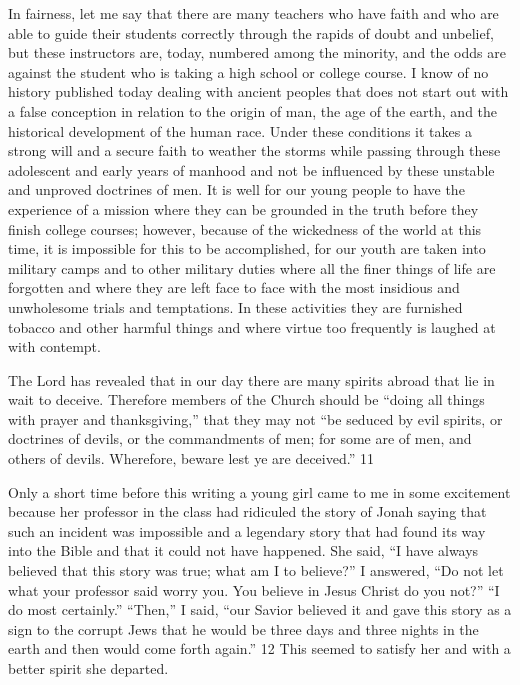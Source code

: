 In fairness, let me say that there are many teachers who have faith and who are able to guide
their students correctly through the rapids of doubt and unbelief, but these instructors are,
today, numbered among the minority, and the odds are against the student who is taking a
high school or college course. I know of no history published today dealing with ancient
peoples that does not start out with a false conception in relation to the origin of man, the age
of the earth, and the historical development of the human race. Under these conditions it
takes a strong will and a secure faith to weather the storms while passing through these
adolescent and early years of manhood and not be influenced by these unstable and unproved
doctrines of men. It is well for our young people to have the experience of a mission where
they can be grounded in the truth before they finish college courses; however, because of the
wickedness of the world at this time, it is impossible for this to be accomplished, for our
youth are taken into military camps and to other military duties where all the finer things of
life are forgotten and where they are left face to face with the most insidious and
unwholesome trials and temptations. In these activities they are furnished tobacco and other
harmful things and where virtue too frequently is laughed at with contempt.

The Lord has revealed that in our day there are many spirits abroad that lie in wait to deceive.
Therefore members of the Church should be ``doing all things with prayer and thanksgiving,''
that they may not ``be seduced by evil spirits, or doctrines of devils, or the commandments of
men; for some are of men, and others of devils. Wherefore, beware lest ye are deceived.'' 11

Only a short time before this writing a young girl came to me in some excitement because
her professor in the class had ridiculed the story of Jonah saying that such an incident was
impossible and a legendary story that had found its way into the Bible and that it could not
have happened. She said, ``I have always believed that this story was true; what am I to
believe?'' I answered, ``Do not let what your professor said worry you. You believe in Jesus
Christ do you not?'' ``I do most certainly.'' ``Then,'' I said, ``our Savior believed it and gave
this story as a sign to the corrupt Jews that he would be three days and three nights in the
earth and then would come forth again.'' 12 This seemed to satisfy her and with a better spirit
she departed.

